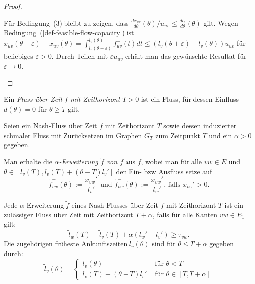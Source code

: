 \begin{proof}
\begin{description}
		Für Bedingung~(3) bleibt zu zeigen, dass $\frac{dx_{uv}}{d\theta}(\theta) /u_{uv}\leq \frac{dl_v}{d\theta}(\theta)$ gilt.
		Wegen Bedingung~(\ref{def-feasible-flow-capacity}) ist $x_{uv}(\theta + \varepsilon)-x_{uv}(\theta) = \int_{l_v(\theta+\varepsilon)}^{l_v(\theta)} f_{uv}^-(t) dt\leq (l_v(\theta + \varepsilon) - l_v(\theta)) u_{uv}$ für beliebiges $\varepsilon > 0$.
		Durch Teilen mit $\varepsilon u_{uv}$ erhält man das gewünschte Resultat für $\varepsilon \rightarrow 0$.
	\end{description}	
\end{proof}

\begin{definition}
	Ein \emph{Fluss über Zeit $f$ mit Zeithorizont $T>0$} ist ein Fluss, für dessen Einfluss $d(\theta)= 0$ für $\theta\geq T$ gilt.
\end{definition}

\begin{definition}
	Seien ein Nash-Fluss über Zeit $f$ mit Zeithorizont $T$ sowie dessen induzierter schmaler Fluss mit Zurücksetzen im Graphen $G_T$ zum Zeitpunkt $T$ und ein $\alpha > 0$ gegeben.
	
	
	Man erhalte die \emph{$\alpha$-Erweiterung $\tilde{f}$ von $f$} aus $f$, wobei man für alle $vw\in E$ und $\theta\in [l_v(T), l_v(T)+(\theta-T)l_v']$ den Ein- bzw Ausfluss setze auf
	$$\tilde{f}_{vw}^+(\theta):= \frac{x_{vw}'}{l_v'} \text{ und } \tilde{f}_{vw}^-(\theta):=\frac{x_{vw}'}{l_w'} \text{, falls $x_{vw}'>0$.}$$
\end{definition}

\begin{lemma}
	Jede $\alpha$-Erweiterung $\tilde{f}$ eines Nash-Flusses über Zeit $f$ mit Zeithorizont $T$ ist ein zulässiger Fluss über Zeit mit Zeithorizont $T+\alpha$, falls für alle Kanten $vw\in E_1$ gilt:
	$$\tilde{l}_w(T) - \tilde{l}_v(T) + \alpha(l_w' - l_v') \geq \tau_{vw}.$$
	Die zugehörigen früheste Ankunftszeiten $\tilde{l}_v(\theta)$ sind für $\theta \leq T+\alpha$ gegeben durch:
	$$\tilde{l}_v(\theta) = \begin{cases}
	l_v(\theta) & \text{ für $\theta < T$} \\
	l_v(T) + (\theta - T) l_v' & \text{ für $\theta \in [T, T+\alpha]$}
	\end{cases}$$
\end{lemma}
